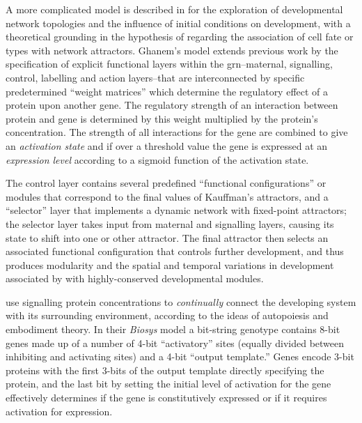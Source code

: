 A more complicated model is described in \cite{Ghanem:2008ct} for the exploration of developmental network
topologies and the influence of initial conditions on development, with a theoretical grounding in the hypothesis of
\cite{Kauffman:1993kk} regarding the association of cell fate or types with network attractors. Ghanem's model extends
previous work by the specification of explicit functional layers within the \gls{grn}--maternal, signalling, control,
labelling and action layers--that are interconnected by specific predetermined ``weight matrices'' which determine the
regulatory effect of a protein upon another gene. The regulatory strength of an interaction between protein and gene is
determined by this weight multiplied by the protein's concentration. The strength of all interactions for the gene are
combined to give an \emph{activation state} and if over a threshold value the gene is expressed at an \emph{expression
	level} according to a sigmoid function of the activation state.

The control layer contains several predefined ``functional configurations'' or modules that correspond to the final
values of Kauffman's attractors, and a ``selector'' layer that implements a dynamic network with fixed-point attractors;
the selector layer takes input from maternal and signalling layers, causing its state to shift into one or other
attractor. The final attractor then selects an associated functional configuration that controls further development,
and thus produces modularity and the spatial and temporal variations in development associated by \cite{Carroll:2005ja}
with highly-conserved developmental modules.

\cite{Quick:2003uq} use signalling protein concentrations to \emph{continually} connect the developing system with its surrounding environment, according to the ideas of autopoiesis \parencite{Varela:1974qd} and embodiment theory. In their \emph{Biosys} model a bit-string genotype contains 8-bit genes made up of a number of 4-bit ``activatory'' sites (equally divided between inhibiting and activating sites) and a 4-bit ``output template.'' Genes encode 3-bit proteins with the first 3-bits of the output template directly specifying the protein, and the last bit by setting the initial level of activation for the gene effectively determines if the gene is \gls{constitutively} expressed or if it requires activation for expression.

